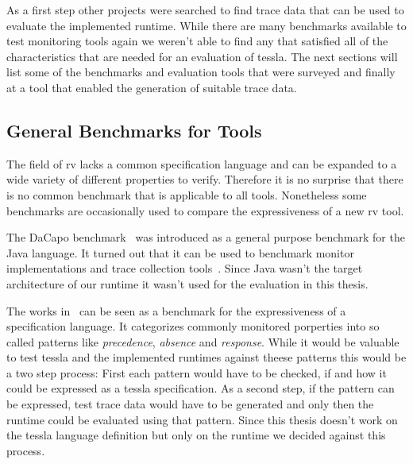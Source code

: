 As a first step other projects were searched to find trace data that can be used to evaluate the implemented runtime.
While there are many benchmarks available to test monitoring tools again we weren't able to find any that satisfied all of the characteristics that are needed for an evaluation of \gls{tessla}.
The next sections will list some of the benchmarks and evaluation tools that were surveyed and finally at a tool that enabled the generation of suitable trace data.

\subsection{General Benchmarks for  Tools}

The field of \gls{rv} lacks a common specification language and can be expanded to a wide variety of different properties to verify.
Therefore it is no surprise that there is no common benchmark that is applicable to all tools.
Nonetheless some benchmarks are occasionally used to compare the expressiveness of a new \gls{rv} tool.

The DaCapo benchmark~\citep{Blackburn2006} was introduced as a general purpose benchmark for the Java language.
It turned out that it can be used to benchmark monitor implementations and trace collection tools~\citep{Wu2016,Chen2007,Marek2012}.
Since Java wasn't the target architecture of our runtime it wasn't used for the evaluation in this thesis.

The works in~\cite{Dwyer1999} can be seen as a benchmark for the expressiveness of a specification language.
It categorizes commonly monitored porperties into so called patterns like \emph{precedence}, \emph{absence} and \emph{response}.
While it would be valuable to test \gls{tessla} and the implemented runtimes against theese patterns this would be a two step process:
First each pattern would have to be checked, if and how it could be expressed as a \gls{tessla} specification.
As a second step, if the pattern can be expressed, test trace data would have to be generated and only then the runtime could be evaluated using that pattern.
Since this thesis doesn't work on the \gls{tessla} language definition but only on the runtime we decided against this process.

